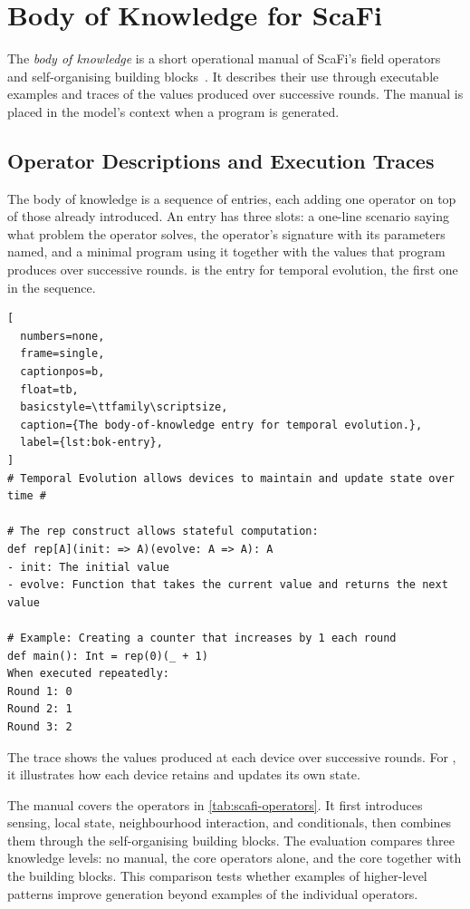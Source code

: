 \section{Body of Knowledge for ScaFi}
\label{sec:body-of-knowledge}

The \emph{body of knowledge} is a short operational manual of ScaFi's field operators and self-organising building blocks~\cite{casadei2022scafi}.
It describes their use through executable examples and traces of the values produced over successive rounds.
The manual is placed in the model's context when a program is generated.

\subsection{Operator Descriptions and Execution Traces}
\label{subsec:bok-structure}

The body of knowledge is a sequence of entries,
each adding one operator on top of those already introduced.
%
An entry has three slots:
a one-line scenario saying what problem the operator solves,
the operator's signature with its parameters named,
and a minimal program using it together with the values that program produces over successive rounds.
%
 is the entry for temporal evolution,
the first one in the sequence.

\begin{lstlisting}[
  numbers=none,
  frame=single,
  captionpos=b,
  float=tb,
  basicstyle=\ttfamily\scriptsize,
  caption={The body-of-knowledge entry for temporal evolution.},
  label={lst:bok-entry},
]
# Temporal Evolution allows devices to maintain and update state over time #

# The rep construct allows stateful computation:
def rep[A](init: => A)(evolve: A => A): A
- init: The initial value
- evolve: Function that takes the current value and returns the next value

# Example: Creating a counter that increases by 1 each round
def main(): Int = rep(0)(_ + 1)
When executed repeatedly:
Round 1: 0
Round 2: 1
Round 3: 2
\end{lstlisting}

The trace shows the values produced at each device over successive rounds.
For , it illustrates how each device retains and updates its own state.

The manual covers the operators in \cref{tab:scafi-operators}.
It first introduces sensing, local state, neighbourhood interaction, and conditionals,
then combines them through the self-organising building blocks.
The evaluation compares three knowledge levels:
no manual, the core operators alone, and the core together with the building blocks.
This comparison tests whether examples of higher-level patterns improve generation beyond examples of the individual operators.

